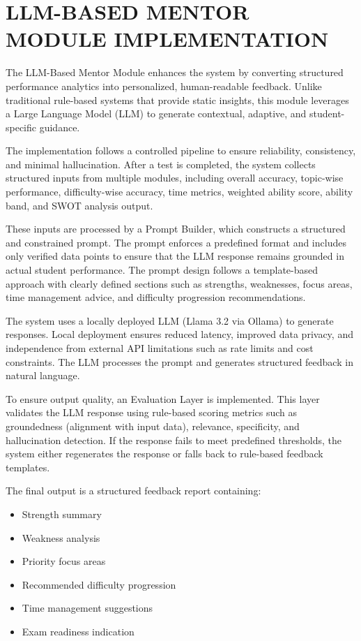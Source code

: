 \begin{sloppypar}
\section{\MakeUppercase{LLM-BASED MENTOR MODULE IMPLEMENTATION}}

The LLM-Based Mentor Module enhances the system by converting structured performance analytics into personalized, human-readable feedback. Unlike traditional rule-based systems that provide static insights, this module leverages a Large Language Model (LLM) to generate contextual, adaptive, and student-specific guidance.

The implementation follows a controlled pipeline to ensure reliability, consistency, and minimal hallucination. After a test is completed, the system collects structured inputs from multiple modules, including overall accuracy, topic-wise performance, difficulty-wise accuracy, time metrics, weighted ability score, ability band, and SWOT analysis output.

These inputs are processed by a Prompt Builder, which constructs a structured and constrained prompt. The prompt enforces a predefined format and includes only verified data points to ensure that the LLM response remains grounded in actual student performance. The prompt design follows a template-based approach with clearly defined sections such as strengths, weaknesses, focus areas, time management advice, and difficulty progression recommendations.

The system uses a locally deployed LLM (Llama 3.2 via Ollama) to generate responses. Local deployment ensures reduced latency, improved data privacy, and independence from external API limitations such as rate limits and cost constraints. The LLM processes the prompt and generates structured feedback in natural language.

To ensure output quality, an Evaluation Layer is implemented. This layer validates the LLM response using rule-based scoring metrics such as groundedness (alignment with input data), relevance, specificity, and hallucination detection. If the response fails to meet predefined thresholds, the system either regenerates the response or falls back to rule-based feedback templates.

The final output is a structured feedback report containing:

\begin{itemize}
\item Strength summary
\item Weakness analysis
\item Priority focus areas
\item Recommended difficulty progression
\item Time management suggestions
\item Exam readiness indication
\end{itemize}


\end{sloppypar}
